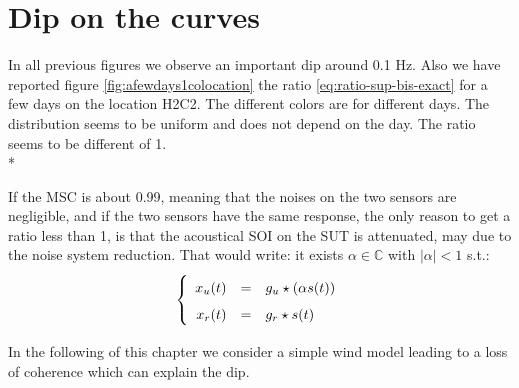 \section{Dip on the curves}
In all previous figures we observe an important dip around 0.1 Hz.  Also we have reported figure \ref{fig:afewdays1colocation} the ratio \eqref{eq:ratio-sup-bis-exact} for a few days on the location H2C2. The different colors are for different days. The distribution seems to be uniform and does not depend on the day. The ratio seems to be different of 1.\\*

If the MSC is about 0.99, meaning that the noises on the two sensors are negligible, and if the two sensors have the same response, the only reason to get a ratio less than 1, is that the acoustical SOI on the SUT is attenuated, may due to the noise system reduction. That would write: it exists $\alpha\in\mathbb{C}$ with $|\alpha|<1$ s.t.:
\begin{eqnarray}
\label{eq:model-of-obervation}
\left\{
\renewcommand\arraystretch{1.6}
\begin{array}{rcl}
x_{\ut}(t)&=&g_{\ut}  \star (\alpha s(t))
\\
x_{\rf}(t)&=&g_{\rf}  \star s(t)
\end{array}
\right.
\end{eqnarray}


In the following of this chapter we consider a simple wind model leading to a loss of coherence which can explain the dip. 

%
%


